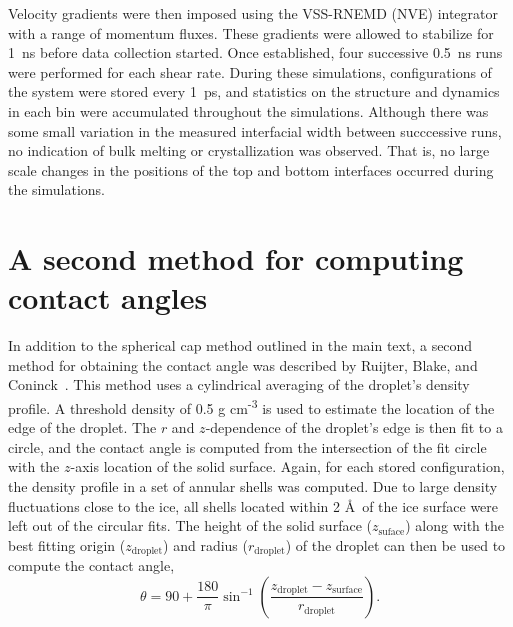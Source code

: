 \documentclass{pnastwo}
\begin{document}
\begin{article}
Velocity gradients were then imposed using the VSS-RNEMD (NVE)
integrator with a range of momentum fluxes. These gradients were
allowed to stabilize for 1~ns before data collection started. Once
established, four successive 0.5~ns runs were performed for each shear
rate.  During these simulations, configurations of the system were
stored every 1~ps, and statistics on the structure and dynamics in
each bin were accumulated throughout the simulations.  Although there
was some small variation in the measured interfacial width between
succcessive runs, no indication of bulk melting or crystallization was
observed.  That is, no large scale changes in the positions of the top
and bottom interfaces occurred during the simulations.

\section{A second method for computing contact angles}
In addition to the spherical cap method outlined in the main text, a
second method for obtaining the contact angle was described by
Ruijter, Blake, and Coninck~\cite{Ruijter99}.  This method uses a
cylindrical averaging of the droplet's density profile.  A threshold
density of 0.5 g cm\textsuperscript{-3} is used to estimate the
location of the edge of the droplet.  The $r$ and $z$-dependence of
the droplet's edge is then fit to a circle, and the contact angle is
computed from the intersection of the fit circle with the $z$-axis
location of the solid surface.  Again, for each stored configuration,
the density profile in a set of annular shells was computed. Due to
large density fluctuations close to the ice, all shells located within
2 \AA\ of the ice surface were left out of the circular fits.  The
height of the solid surface ($z_\mathrm{suface}$) along with the best
fitting origin ($z_\mathrm{droplet}$) and radius
($r_\mathrm{droplet}$) of the droplet can then be used to compute the
contact angle,
\begin{equation}
\theta =  90 + \frac{180}{\pi} \sin^{-1}\left(\frac{z_\mathrm{droplet} -
  z_\mathrm{surface}}{r_\mathrm{droplet}} \right).
\end{equation}


\end{article}
\end{document}
